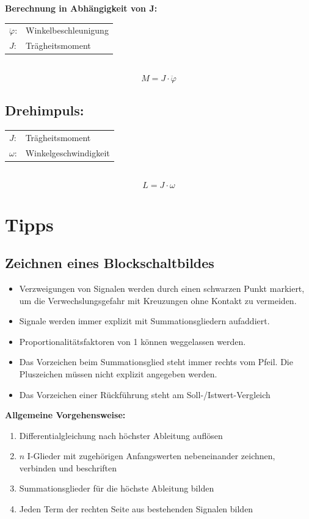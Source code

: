 \documentclass[10pt,a4paper]{article}
\renewcommand{\arraystretch}{1.5}
\begin{document}
\textbf{Berechnung in Abhängigkeit von J:} \\
\begin{tabularx}{\columnwidth}{lX}
	$\ddot \varphi$: & Winkelbeschleunigung \\
	$J$: & Trägheitsmoment
\end{tabularx} \\
$$
	M = J ⋅ \ddot \varphi
$$


\subsection{Drehimpuls:}
\begin{tabularx}{\columnwidth}{lX}
	$J$: & Trägheitsmoment \\
	$\omega$: & Winkelgeschwindigkeit
\end{tabularx} \\
$$
	L = J ⋅ \omega
$$

\renewcommand{\arraystretch}{1.5}
\section{Tipps}
\subsection{Zeichnen eines Blockschaltbildes}
\begin{itemize}
	\item Verzweigungen von Signalen werden durch einen schwarzen Punkt markiert, um die Verwechslungsgefahr mit Kreuzungen ohne Kontakt zu vermeiden.
	\item Signale werden immer explizit mit Summationsgliedern aufaddiert.
	\item Proportionalitätsfaktoren von 1 können weggelassen werden.
	\item Das Vorzeichen beim Summationsglied steht immer rechts vom Pfeil. Die Pluszeichen müssen nicht explizit angegeben werden.
	\item Das Vorzeichen einer Rückführung steht am Soll-/Istwert-Vergleich
\end{itemize}
\textbf{Allgemeine Vorgehensweise:}
\begin{enumerate}
	\item Differentialgleichung nach höchster Ableitung auflösen
	\item $n$ I-Glieder mit zugehörigen Anfangswerten nebeneinander zeichnen, verbinden und beschriften
	\item Summationsglieder für die höchste Ableitung bilden
	\item Jeden Term der rechten Seite aus bestehenden Signalen bilden
\end{enumerate}
\end{document}

